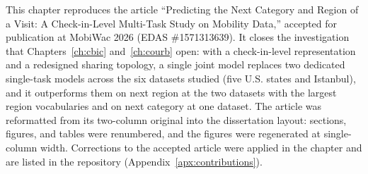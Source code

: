 \begin{chapterpreface}
This chapter reproduces the article ``Predicting the Next Category and Region of a
Visit: A Check-in-Level Multi-Task Study on Mobility Data,'' accepted for publication
at MobiWac 2026 (EDAS \#1571313639). It closes the
investigation that Chapters~\ref{ch:cbic} and~\ref{ch:courb} open: with a
check-in-level representation and a redesigned sharing topology, a single joint
model replaces two dedicated single-task
models across the six datasets studied (five U.S. states and Istanbul), and it
outperforms them on next region at the two datasets with the largest region
vocabularies and on next category at one dataset. The article was
reformatted from its two-column original into the dissertation layout: sections,
figures, and tables were renumbered, and the figures were regenerated at
single-column width. Corrections to the accepted article were applied in the chapter and
are listed in the repository (Appendix~\ref{apx:contributions}).
\end{chapterpreface}

